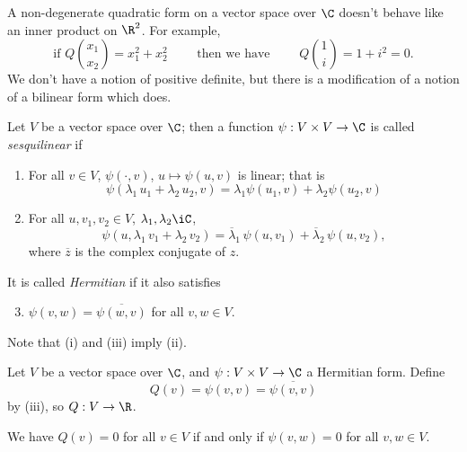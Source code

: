 \setcounter{lecture}{6}

\renewcommand{\Im}{\mathfrak{I}}

A non-degenerate quadratic form on a vector space over $\C$ doesn't behave like an inner product on $\R^2$. For example,
\begin{equation*}
	\text{if } Q {x_1 \choose x_2} = x_1^2 + x_2^2
	\qquad
	\text{ then we have }
	\qquad
	Q {1 \choose i} = 1+i^2 = 0.
\end{equation*}
We don't have a notion of positive definite, but there is a modification of a notion of a bilinear form which does.

\begin{definition}
	Let $V$ be a vector space over $\C$; then a function $\psi:V\times V\to\C$ is called \emph{sesquilinear} if %
	\begin{enumerate}
		\shortskip
		\item For all $v\in V$, $\psi(\cdot,v)$, $u\mapsto \psi(u,v)$ is linear; that is%
		\begin{equation*}
			\psi(\lambda_1\,u_1 + \lambda_2\,u_2 , v) =
			\lambda_1 \psi(u_1,v) + \lambda_2\psi(u_2,v) %
		\end{equation*}
		\item For all $u,v_1,v_2\in V$, $\lambda_1,\lambda_2\iC$,
		\begin{equation*}
			\psi(u,\lambda_1\,v_1+\lambda_2\,v_2) = \overline{\lambda}_1\,\psi(u,v_1) + \overline{\lambda}_2\,\psi(u,v_2), %
		\end{equation*}
		where $\overline{z}$ is the complex conjugate of $z$. %
	\end{enumerate}
	It is called \emph{Hermitian} if it also satisfies
	\begin{enumerate}
		\setcounter{enumi}{2}
		\item $\psi(v,w) = \overline{\psi(w,v)}$ for all $v,w\in V$.
	\end{enumerate}
	Note that (i) and (iii) imply (ii).
\end{definition}

Let $V$ be a vector space over $\C$, and $\psi:V\times V\to\C$ a Hermitian form. Define
\begin{equation*}
	Q(v) = \psi(v,v) = \overline{\psi(v,v)}
\end{equation*}
by (iii), so $Q:V\to\R$.

\begin{lemma}
	We have $Q(v)=0$ for all $v\in V$ if and only if $\psi(v,w)=0$ for all $v,w\in V$. %
\end{lemma}

